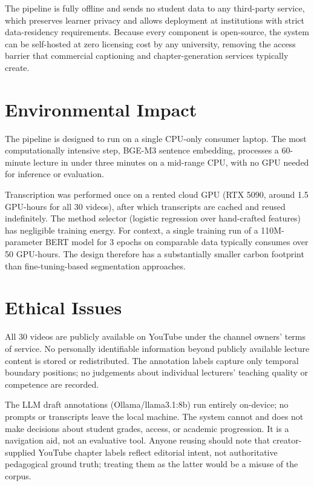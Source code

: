 The \lecseg{} pipeline is fully offline and sends no student data to any
third-party service, which preserves learner privacy and allows deployment at
institutions with strict data-residency requirements.
Because every component is open-source, the system can be self-hosted at zero
licensing cost by any university, removing the access barrier that commercial
captioning and chapter-generation services typically create.

\section{Environmental Impact}

The pipeline is designed to run on a single CPU-only consumer laptop.
The most computationally intensive step, BGE-M3 sentence embedding,
processes a 60-minute lecture in under three minutes on a mid-range CPU, with
no GPU needed for inference or evaluation.

Transcription was performed once on a rented cloud GPU (RTX 5090, around 1.5
GPU-hours for all 30 videos), after which transcripts are cached and reused
indefinitely.
The method selector (logistic regression over hand-crafted features) has
negligible training energy.
For context, a single training run of a 110M-parameter BERT model for 3 epochs
on comparable data typically consumes over 50 GPU-hours.
The \lecseg{} design therefore has a substantially smaller carbon footprint than
fine-tuning-based segmentation approaches.

\section{Ethical Issues}

All 30 \dataset{} videos are publicly available on YouTube under the channel
owners' terms of service.
No personally identifiable information beyond publicly available lecture content
is stored or redistributed.
The annotation labels capture only temporal boundary positions; no judgements
about individual lecturers' teaching quality or competence are recorded.

The LLM draft annotations (Ollama/llama3.1:8b) run entirely on-device;
no prompts or transcripts leave the local machine.
The system cannot and does not make decisions about student grades, access, or
academic progression. It is a navigation aid, not an evaluative tool.
Anyone reusing \dataset{} should note that creator-supplied YouTube chapter
labels reflect editorial intent, not authoritative pedagogical ground truth;
treating them as the latter would be a misuse of the corpus.

